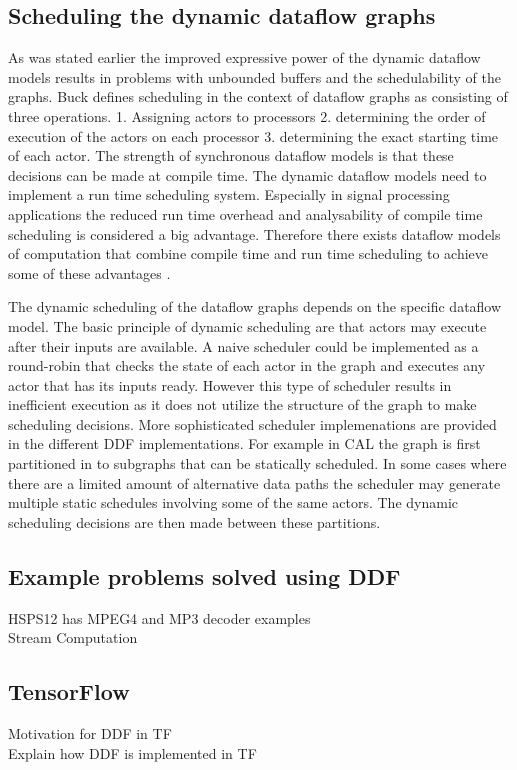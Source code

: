 \documentclass[conference,a4paper]{IEEEtran}
\begin{document}
\subsection{Scheduling the dynamic dataflow graphs}
As was stated earlier the improved expressive power of the dynamic dataflow
models results in problems with unbounded buffers and the schedulability of the
graphs. Buck \cite{buck1993scheduling} defines scheduling in the context of
dataflow graphs as consisting of three operations. 1. Assigning actors to
processors 2. determining the order of execution of the actors on each processor
3. determining the exact starting time of each actor. The strength of
synchronous dataflow models is that these decisions can be made at compile time.
The dynamic dataflow models need to implement a run time scheduling system.
Especially in signal processing applications the reduced run time overhead and
analysability of compile time scheduling is considered a big advantage.
Therefore there exists dataflow models of computation that combine compile time
and run time scheduling to achieve some of these advantages
\cite{buck1993scheduling, bhattacharyya2013handbook}.

The dynamic scheduling of the dataflow graphs depends on the specific dataflow
model. The basic principle of dynamic scheduling are that actors may execute
after their inputs are available. A naive scheduler could be implemented as a
round-robin that checks the state of each actor in the graph and executes any
actor that has its inputs ready. However this type of scheduler results in
inefficient execution as it does not utilize the structure of the graph to make
scheduling decisions. More sophisticated scheduler implemenations are provided
in the different DDF implementations. For example in CAL the graph is first
partitioned in to subgraphs that can be statically scheduled. In some cases
where there are a limited amount of alternative data paths the scheduler may
generate multiple static schedules involving some of the same actors. The
dynamic scheduling decisions are then made between these partitions.
\cite{eker2003cal}

\subsection{Example problems solved using DDF}
HSPS12 has MPEG4 and MP3 decoder examples \\
Stream Computation \\

\subsection{TensorFlow}
Motivation for DDF in TF \\
Explain how DDF is implemented in TF \\
\end{document}

